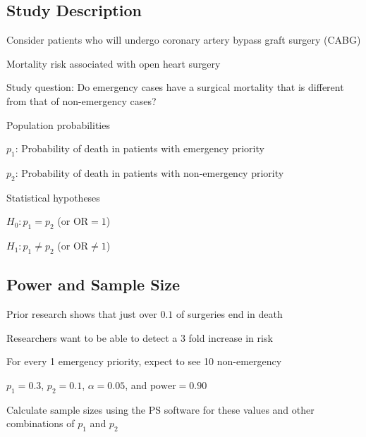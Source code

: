 \subsection{Study Description}
\bi
  \item Consider patients who will undergo coronary artery bypass graft surgery (CABG)
  \item Mortality risk associated with open heart surgery
  \item Study question: Do emergency cases have a surgical mortality that is different from that of non-emergency cases?
  \item Population probabilities
  \bi
    \item $p_1$: Probability of death in patients with emergency priority
    \item $p_2$: Probability of death in patients with non-emergency priority
  \ei
  \item Statistical hypotheses
  \bi
  \item $H_0: p_1 = p_2$ (or $\textrm{OR} = 1$)
  \item $H_1: p_1 \neq p_2$ (or $\textrm{OR} \neq 1$)
  \ei
\ei

\subsection{Power and Sample Size}

\bi
  \item Prior research shows that just over $0.1$ of surgeries end in death
  \item Researchers want to be able to detect a 3 fold increase in risk
  \item For every 1 emergency priority, expect to see 10 non-emergency
  \item $p_1 = 0.3$, $p_2 = 0.1$, $\alpha = 0.05$, and $\textrm{power} = 0.90$
  \item Calculate sample sizes using the PS software for these values and other combinations of $p_1$ and $p_2$
\ei

